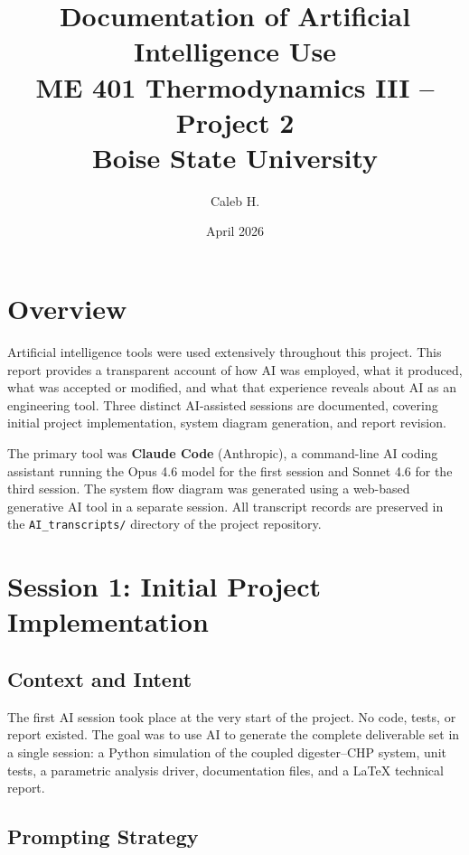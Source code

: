 \documentclass[12pt, letterpaper]{article}
\title{%
  \textbf{Documentation of Artificial Intelligence Use} \\[0.5em]
  \large ME 401 Thermodynamics III -- Project 2 \\
  Boise State University
}
\author{Caleb H.}
\date{April 2026}
\begin{document}
\maketitle

\section{Overview}

Artificial intelligence tools were used extensively throughout this project. This report provides a transparent account of how AI was employed, what it produced, what was accepted or modified, and what that experience reveals about AI as an engineering tool. Three distinct AI-assisted sessions are documented, covering initial project implementation, system diagram generation, and report revision.

The primary tool was \textbf{Claude Code} (Anthropic), a command-line AI coding assistant running the Opus 4.6 model for the first session and Sonnet 4.6 for the third session. The system flow diagram was generated using a web-based generative AI tool in a separate session. All transcript records are preserved in the \texttt{AI\_transcripts/} directory of the project repository.

\section{Session 1: Initial Project Implementation}

\subsection{Context and Intent}

The first AI session took place at the very start of the project. No code, tests, or report existed. The goal was to use AI to generate the complete deliverable set in a single session: a Python simulation of the coupled digester--CHP system, unit tests, a parametric analysis driver, documentation files, and a LaTeX technical report.

\subsection{Prompting Strategy}
\end{document}
